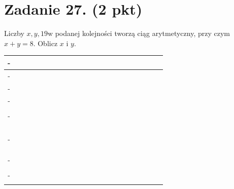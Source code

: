 \documentclass[10pt]{article}
\begin{document}
\section*{Zadanie 27. (2 pkt)}
Liczby \(x, y, 19 \mathrm{w}\) podanej kolejności tworzą ciąg arytmetyczny, przy czym \(x+y=8\). Oblicz \(x\) i \(y\).

\begin{center}
\begin{tabular}{|c|c|c|c|c|c|c|c|c|c|c|c|c|c|c|c|c|c|c|c|c|c|}
\hline
- &  &  &  &  &  &  &  &  &  &  &  &  &  &  &  &  &  &  &  &  &  \\
\hline
- &  &  &  &  &  &  &  &  &  &  &  &  &  &  &  &  &  &  &  &  &  \\
\hline
- &  &  &  &  &  &  &  &  &  &  &  &  &  &  &  &  &  &  &  &  &  \\
\hline
- &  &  &  &  &  &  &  &  &  &  &  &  &  &  &  &  &  &  &  &  &  \\
\hline
 &  &  &  &  &  &  &  &  &  &  &  &  &  &  &  &  &  &  &  &  &  \\
\hline
- &  &  &  &  &  &  &  &  &  &  &  &  &  &  &  &  &  &  &  &  &  \\
\hline
 &  &  &  &  &  &  &  &  &  &  &  &  &  &  &  &  &  &  &  &  &  \\
\hline
 &  &  &  &  &  &  &  &  &  &  &  &  &  &  &  &  &  &  &  &  &  \\
\hline
 &  &  &  &  &  &  &  &  &  &  &  &  &  &  &  &  &  &  &  &  &  \\
\hline
 &  &  &  &  &  &  &  &  &  &  &  &  &  &  &  &  &  &  &  &  &  \\
\hline
- &  &  &  &  &  &  &  &  &  &  &  &  &  &  &  &  &  &  &  &  &  \\
\hline
 &  &  &  &  &  &  &  &  &  &  &  &  &  &  &  &  &  &  &  &  &  \\
\hline
 &  &  &  &  &  &  &  &  &  &  &  &  &  &  &  &  &  &  &  &  &  \\
\hline
 &  &  &  &  &  &  &  &  &  &  &  &  &  &  &  &  &  &  &  &  &  \\
\hline
- &  &  &  &  &  &  &  &  &  &  &  &  &  &  &  &  &  &  &  &  &  \\
\hline
 &  &  &  &  &  &  &  &  &  &  &  &  &  &  &  &  &  &  &  &  &  \\
\hline
- &  &  &  &  &  &  &  &  &  &  &  &  &  &  &  &  &  &  &  &  &  \\
\hline
 &  &  &  &  &  &  &  &  &  &  &  &  &  &  &  &  &  &  &  &  &  \\
\hline
\end{tabular}
\end{center}
\end{document}
